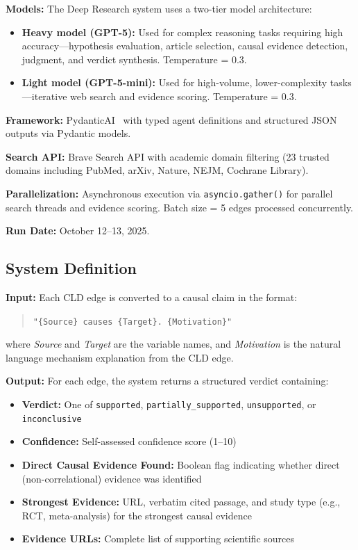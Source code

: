 \textbf{Models:} The Deep Research system uses a two-tier model architecture:
\begin{itemize}[noitemsep]
    \item \textbf{Heavy model (GPT-5):} Used for complex reasoning tasks requiring high accuracy---hypothesis evaluation, article selection, causal evidence detection, judgment, and verdict synthesis. Temperature = 0.3.
    \item \textbf{Light model (GPT-5-mini):} Used for high-volume, lower-complexity tasks---iterative web search and evidence scoring. Temperature = 0.3.
\end{itemize}

\textbf{Framework:} PydanticAI~\cite{pydanticai2024} with typed agent definitions and structured JSON outputs via Pydantic models.

\textbf{Search API:} Brave Search API with academic domain filtering (23 trusted domains including PubMed, arXiv, Nature, NEJM, Cochrane Library).

\textbf{Parallelization:} Asynchronous execution via \texttt{asyncio.gather()} for parallel search threads and evidence scoring. Batch size = 5 edges processed concurrently.

\textbf{Run Date:} October 12--13, 2025.

\subsection{System Definition}
\label{sec:rq3_dr_system}

\textbf{Input:} Each CLD edge is converted to a causal claim in the format:
\begin{quote}
\texttt{"\{Source\} causes \{Target\}. \{Motivation\}"}
\end{quote}
where \textit{Source} and \textit{Target} are the variable names, and \textit{Motivation} is the natural language mechanism explanation from the CLD edge.

\textbf{Output:} For each edge, the system returns a structured verdict containing:
\begin{itemize}[noitemsep]
    \item \textbf{Verdict:} One of \texttt{supported}, \texttt{partially\_supported}, \texttt{unsupported}, or \texttt{inconclusive}
    \item \textbf{Confidence:} Self-assessed confidence score (1--10)
    \item \textbf{Direct Causal Evidence Found:} Boolean flag indicating whether direct (non-correlational) evidence was identified
    \item \textbf{Strongest Evidence:} URL, verbatim cited passage, and study type (e.g., RCT, meta-analysis) for the strongest causal evidence
    \item \textbf{Evidence URLs:} Complete list of supporting scientific sources
\end{itemize}

